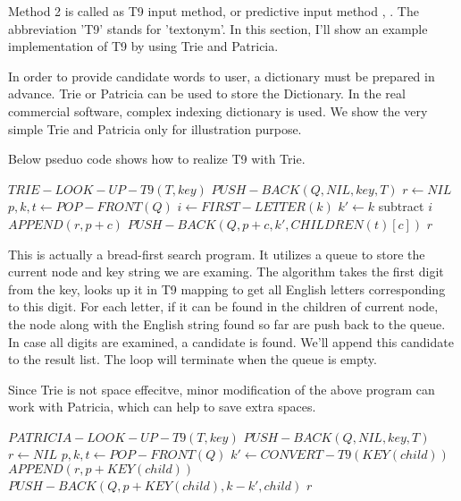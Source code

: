 \documentclass{article}
\begin{document}
Method 2 is called as T9 input method, or predictive input method
\cite{wiki-t9}, \cite {wiki-predictive-text}. The abbreviation 'T9' stands
for 'textonym'. In this section, I'll show an example implementation of T9
by using Trie and Patricia.

In order to provide candidate words to user, a dictionary must be prepared
in advance. Trie or Patricia can be used to store the Dictionary. In the real
commercial software, complex indexing dictionary is used. We show the very 
simple Trie and Patricia only for illustration purpose.

Below pseduo code shows how to realize T9 with Trie.

\begin{algorithmic}
\STATE $TRIE-LOOK-UP-T9(T, key)$
  \STATE $PUSH-BACK(Q, NIL, key, T)$
  \STATE $r \leftarrow NIL$
    \STATE $p, k, t \leftarrow POP-FRONT(Q)$
    \STATE $i \leftarrow FIRST-LETTER(k)$
        \STATE $k' \leftarrow k$ subtract $i$
          \STATE $APPEND(r, p+c)$
        \ELSE
          \STATE $PUSH-BACK(Q, p+c, k', CHILDREN(t)[c])$
        \ENDIF
      \ENDIF
    \ENDFOR
  \ENDWHILE
  \RETURN $r$
\end{algorithmic}

This is actually a bread-first search program. It utilizes a queue to store
the current node and key string we are examing. The algorithm takes the first
digit from the key, looks up it in T9 mapping to get all English letters 
corresponding to this digit. For each letter, if it can be found in the children
of current node, the node along with the English string found so far are
push back to the queue. In case all digits are examined, a candidate is found.
We'll append this candidate to the result list. The loop will terminate when
the queue is empty.

Since Trie is not space effecitve, minor modification of the above program can
work with Patricia, which can help to save extra spaces.

\begin{algorithmic}
\STATE $PATRICIA-LOOK-UP-T9(T, key)$
  \STATE $PUSH-BACK(Q, NIL, key, T)$
  \STATE $r \leftarrow NIL$
    \STATE $p, k, t \leftarrow POP-FRONT(Q)$
      \STATE $k' \leftarrow CONVERT-T9(KEY(child))$
          \STATE $APPEND(r, p+KEY(child))$
        \ELSE
          \STATE $PUSH-BACK(Q, p+KEY(child), k-k', child)$
        \ENDIF
      \ENDIF
    \ENDFOR
  \ENDWHILE
  \RETURN $r$
\end{algorithmic}
\end{document}
